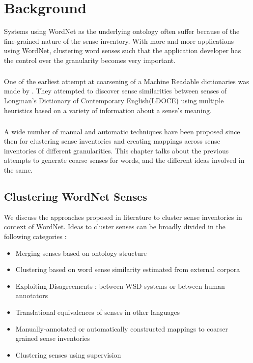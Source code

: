 \chapter{Background}
\label{chapter:Background}
Systems using WordNet as the underlying ontology often suffer because of the fine-grained nature of the sense inventory. With more and more applications using WordNet, clustering word senses such that the application developer has the control over the granularity becomes very important.

\paragraph{}
One of the earliest attempt at coarsening of a Machine Readable dictionaries was made by \citep{Dolan:1994}. 
They attempted to discover sense similarities between senses of Longman's Dictionary of Contemporary English(LDOCE) using multiple heuristics based on a variety of information about a sense's meaning.

\paragraph{}
A wide number of manual and automatic techniques have been proposed since then for clustering sense inventories and creating mappings across sense inventories of different granularities. This chapter talks about the previous attempts to generate coarse senses for words, and the different ideas involved in the same.

\section{Clustering WordNet Senses}
We discuss the approaches proposed in literature to cluster sense inventories in context of WordNet. Ideas to cluster senses can be broadly divided in the following categories :
\begin{itemize}
\item Merging senses based on ontology structure
\item Clustering based on word sense similarity estimated from external corpora
\item Exploiting Disagreements : between WSD systems or between human annotators
\item Translational equivalences of senses in other languages
\item Manually-annotated or automatically constructed mappings to coarser grained sense inventories
\item Clustering senses using supervision
\end{itemize}

